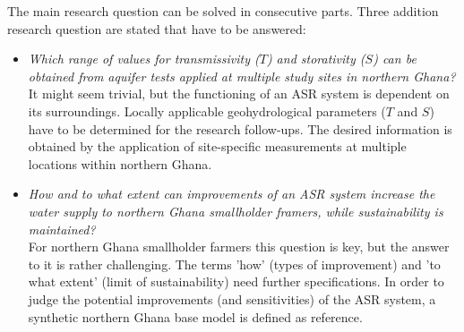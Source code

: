 The main research question can be solved in consecutive parts. Three addition research question are stated that have to be answered:

\begin{itemize}
\item{\textit{Which range of values for transmissivity ($T$) and storativity ($S$) can be obtained from aquifer tests applied at multiple study sites in northern Ghana?}
\smallskip \\
It might seem trivial, but the functioning of an ASR system is dependent on its surroundings. Locally applicable geohydrological parameters ($T$ and $S$) have to be determined for the research follow-ups. The desired information is obtained by the application of site-specific measurements at multiple locations within northern Ghana.} 
\end{itemize} 

\begin{itemize} 
\item{\textit{How and to what extent can improvements of an ASR system increase the water supply to northern Ghana smallholder framers, while sustainability is maintained?}
\smallskip \\
For northern Ghana smallholder farmers this question is key, but the answer to it is rather challenging. The terms 'how' (types of improvement) and 'to what extent' (limit of sustainability) need further specifications. In order to judge the potential improvements (and sensitivities) of the ASR system, a synthetic northern Ghana base model is defined as reference.}
\end{itemize}

